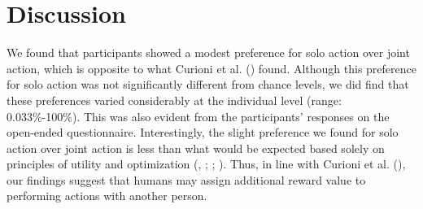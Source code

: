 \documentclass[
  man,
  floatsintext,
  longtable,
  nolmodern,
  notxfonts,
  notimes,
  colorlinks=true,linkcolor=blue,citecolor=blue,urlcolor=blue]{apa7}
\begin{document}
\clearpage

\section{Discussion}\label{discussion}

We found that participants showed a modest preference for solo action
over joint action, which is opposite to what Curioni et al.
() found. Although this preference for
solo action was not significantly different from chance levels, we did
find that these preferences varied considerably at the individual level
(range: 0.033\%-100\%). This was also evident from the participants'
responses on the open-ended questionnaire. Interestingly, the slight
preference we found for solo action over joint action is less than what
would be expected based solely on principles of utility and optimization
(,
;
;
). Thus, in line with Curioni
et al. (), our findings suggest that
humans may assign additional reward value to performing actions with
another person.
\end{document}
